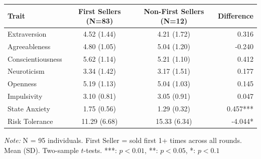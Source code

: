\begingroup
\centering
\small
\begin{tabular}{lccr}
\toprule
Trait & First Sellers (N=83) & Non-First Sellers (N=12) & Difference \\
\midrule
Extraversion & 4.52 (1.44) & 4.21 (1.72) & 0.316 \\
Agreeableness & 4.80 (1.05) & 5.04 (1.20) & -0.240 \\
Conscientiousness & 5.62 (1.14) & 5.21 (1.10) & 0.412 \\
Neuroticism & 3.34 (1.42) & 3.17 (1.51) & 0.177 \\
Openness & 5.19 (1.13) & 5.04 (1.03) & 0.145 \\
Impulsivity & 3.10 (0.81) & 3.05 (0.91) & 0.047 \\
State Anxiety & 1.75 (0.56) & 1.29 (0.32) & 0.457*** \\
Risk Tolerance & 11.29 (6.68) & 15.33 (6.34) & -4.044* \\
\bottomrule
\end{tabular}
\par
\vspace{2pt}
{\footnotesize \textit{Note:} N = 95 individuals. First Seller = sold first 1+ times across all rounds.}\\
{\footnotesize Mean (SD). Two-sample $t$-tests. ***: $p<0.01$, **: $p<0.05$, *: $p<0.1$}
\endgroup
